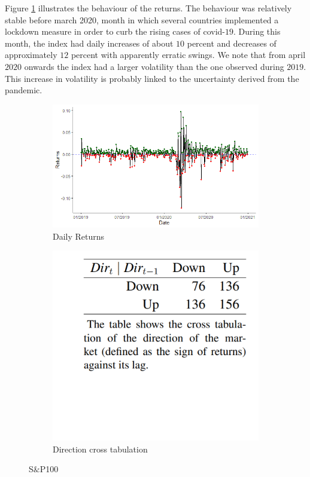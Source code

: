 \documentclass[a4paper, 12pt]{report}
\begin{document}
    
    Figure \ref{Fig:returns} illustrates the behaviour of the returns. The behaviour was relatively stable before march 2020, month in which several countries implemented a lockdown measure in order to curb the rising cases of covid-$19$. During this month, the index had daily increases of about $10$ percent and decreases of approximately $12$ percent with apparently erratic swings. We note that from april $2020$ onwards the index had a larger volatility than the one observed during $2019$.  This increase in volatility is probably linked to the uncertainty derived from the pandemic.
    
    
    \begin{figure}[H]
    \begin{subfigure}[t]{.64\textwidth}
        \centering
        \includegraphics[width=\textwidth]{graphs/Returns.png}
        \caption{Daily Returns}
        \label{Fig:returns}
    \end{subfigure}
    \begin{subfigure}[t]{.34\textwidth}
        \centering
        \includegraphics[width=\textwidth]{graphs/table_dir.png}
        \caption{Direction cross tabulation}
        \label{Fig:DirectionCross}
    \end{subfigure}
    \caption{S$\&$P100}
    \label{Fig:returns_crosstab}
    \end{figure}
    
\end{document}
